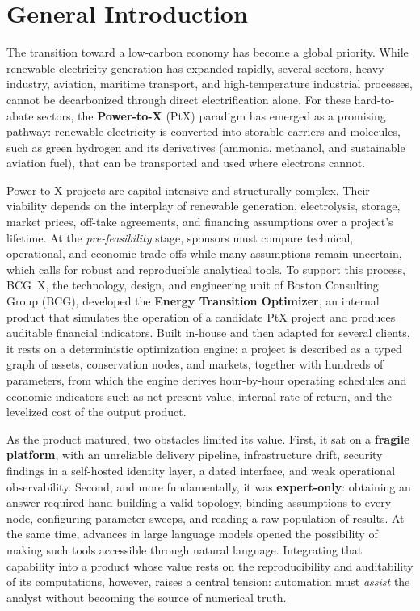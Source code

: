 \chapter*{General Introduction}
\label{chap:general-introduction}

The transition toward a low-carbon economy has become a global priority. While
renewable electricity generation has expanded rapidly, several sectors, heavy
industry, aviation, maritime transport, and high-temperature industrial
processes, cannot be decarbonized through direct electrification alone. For
these hard-to-abate sectors, the \textbf{Power-to-X} (PtX) paradigm has emerged
as a promising pathway: renewable electricity is converted into storable
carriers and molecules, such as green hydrogen and its derivatives (ammonia,
methanol, and sustainable aviation fuel), that can be transported and used where
electrons cannot.

Power-to-X projects are capital-intensive and structurally complex. Their
viability depends on the interplay of renewable generation, electrolysis,
storage, market prices, off-take agreements, and financing assumptions over a
project's lifetime. At the \emph{pre-feasibility} stage, sponsors must compare
technical, operational, and economic trade-offs while many assumptions remain
uncertain, which calls for robust and reproducible analytical tools. To support
this process, BCG~X, the technology, design, and engineering unit of Boston
Consulting Group (BCG), developed the \textbf{Energy Transition Optimizer}, an
internal product that simulates the operation of a candidate PtX project and
produces auditable financial indicators. Built in-house and then adapted for
several clients, it rests on a deterministic optimization engine: a project is
described as a typed graph of assets, conservation nodes, and markets, together
with hundreds of parameters, from which the engine derives hour-by-hour
operating schedules and economic indicators such as net present value, internal
rate of return, and the levelized cost of the output product.

As the product matured, two obstacles limited its value. First, it sat on a
\textbf{fragile platform}, with an unreliable delivery pipeline, infrastructure
drift, security findings in a self-hosted identity layer, a dated interface, and
weak operational observability. Second, and more fundamentally, it was
\textbf{expert-only}: obtaining an answer required hand-building a valid
topology, binding assumptions to every node, configuring parameter sweeps, and
reading a raw population of results. At the same time, advances in large
language models opened the possibility of making such tools accessible through
natural language. Integrating that capability into a product whose value rests
on the reproducibility and auditability of its computations, however, raises a
central tension: automation must \emph{assist} the analyst without becoming the
source of numerical truth.

